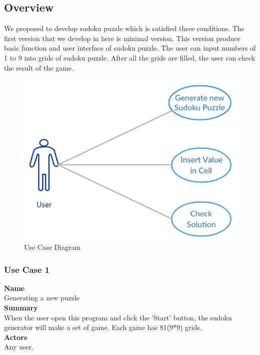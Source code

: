 \documentclass[12pt]{article}
\begin{document}
\subsection{Overview}
We proposed to develop sudoku puzzle which is satisfied three conditions.
The first version that we develop in here is minimal version.
This version produce basic function and user interface of sudoku puzzle.
The user can input numbers of 1 to 9 into grids of sudoku puzzle.
After all the grids are filled, the user can check the result of the game.\\
\begin{figure}[h]
\begin{center}
\includegraphics[scale=0.5]{use_case_diagram.jpg}
\caption{Use Case Diagram}
\label{fig:use-case-diagram}
\end{center}
\end{figure}

\subsubsection{Use Case 1} \label{uc:1}
\noindent
{\bf Name}\\
Generating a new puzzle\\

\noindent
{\bf Summary}\\
When the user open this program and click the 'Start' button, the sudoku generator will make a set of game. Each game has 81(9*9) grids.\\

\noindent
{\bf Actors}\\
Any user. \\
\end{document}
